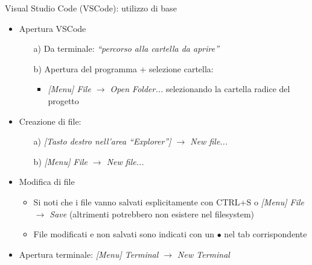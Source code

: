 \documentclass[xcolor=dvipsnames,presentation]{beamer}
\begin{document}
\begin{frame}{}

\end{frame}

\begin{frame}{Visual Studio Code (VSCode): utilizzo di base}

\begin{itemize}
\item Apertura VSCode
	\begin{itemize}
	\item[a)] Da terminale:  \emph{``percorso alla cartella da aprire''}
	\item[b)] Apertura del programma + selezione cartella:
		\begin{itemize}
		\item \emph{[Menu] File $\to$ Open Folder...} selezionando la cartella radice del progetto
		\end{itemize}
	\end{itemize}

\item Creazione di file:
	\begin{itemize}
	\item[a)] \emph{[Tasto destro nell'area ``Explorer''] $\to$ New file...}
	\item[b)] \emph{[Menu] File $\to$ New file...}
	\end{itemize}
	
\item Modifica di file
	\begin{itemize}
	\item Si noti che i file vanno salvati esplicitamente con CTRL+S o \emph{[Menu] File $\to$ Save} (altrimenti potrebbero non esistere nel filesystem)
	\item File modificati e non salvati sono indicati con un $\bullet$ nel tab corrispondente
	\end{itemize}

\item Apertura terminale: 
\emph{[Menu] Terminal $\to$ New Terminal}



\end{itemize}

\end{frame}

\begin{frame}{}


\end{frame}
\end{document}

